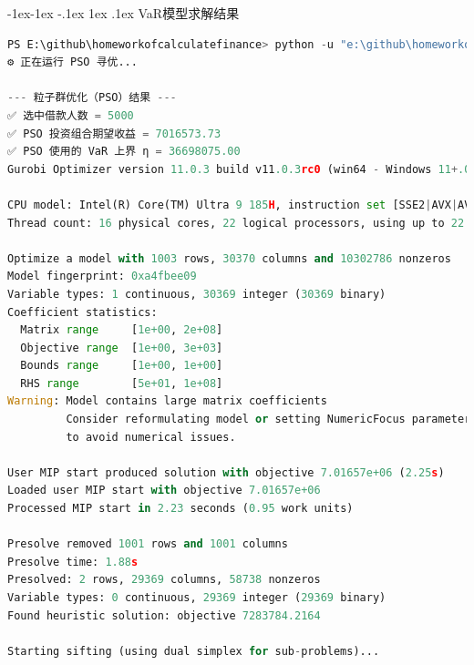\documentclass{write_paper}
\makeatletter
\renewcommand\subsection{\@startsection{subsection}{2}{\z@}%
                                     {-1ex\@plus -1ex \@minus -.1ex}%
                                     {1ex \@plus .1ex}%
                                     {\normalfont \normalsize \bfseries}}
\makeatother
\begin{document}
\subsection{VaR模型求解结果}
\begin{lstlisting}[language=python]
  PS E:\github\homeworkofcalculatefinance> python -u "e:\github\homeworkofcalculatefinance\5-25-模型求解\pso_gurobi_VaR.py"
⚙️ 正在运行 PSO 寻优...

--- 粒子群优化（PSO）结果 ---
✅ 选中借款人数 = 5000
✅ PSO 投资组合期望收益 = 7016573.73
✅ PSO 使用的 VaR 上界 η = 36698075.00
Gurobi Optimizer version 11.0.3 build v11.0.3rc0 (win64 - Windows 11+.0 (26100.2))

CPU model: Intel(R) Core(TM) Ultra 9 185H, instruction set [SSE2|AVX|AVX2]
Thread count: 16 physical cores, 22 logical processors, using up to 22 threads

Optimize a model with 1003 rows, 30370 columns and 10302786 nonzeros
Model fingerprint: 0xa4fbee09
Variable types: 1 continuous, 30369 integer (30369 binary)
Coefficient statistics:
  Matrix range     [1e+00, 2e+08]
  Objective range  [1e+00, 3e+03]
  Bounds range     [1e+00, 1e+00]
  RHS range        [5e+01, 1e+08]
Warning: Model contains large matrix coefficients
         Consider reformulating model or setting NumericFocus parameter
         to avoid numerical issues.

User MIP start produced solution with objective 7.01657e+06 (2.25s)
Loaded user MIP start with objective 7.01657e+06
Processed MIP start in 2.23 seconds (0.95 work units)

Presolve removed 1001 rows and 1001 columns
Presolve time: 1.88s
Presolved: 2 rows, 29369 columns, 58738 nonzeros
Variable types: 0 continuous, 29369 integer (29369 binary)
Found heuristic solution: objective 7283784.2164

Starting sifting (using dual simplex for sub-problems)...


\end{lstlisting}
\end{document}
